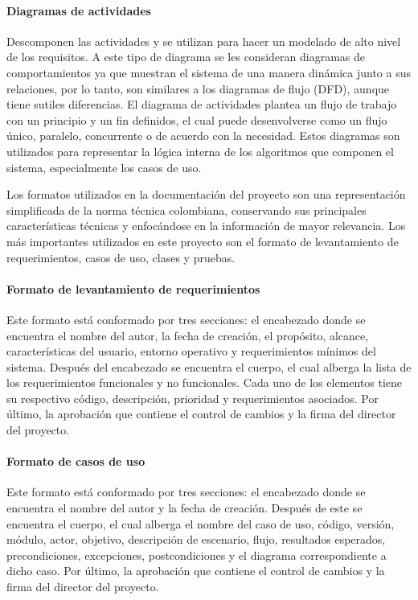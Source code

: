 \paragraph{Diagramas de actividades} Descomponen las actividades y se utilizan para hacer un modelado de alto nivel de los requisitos. A este tipo de diagrama se les consideran diagramas de comportamientos ya que muestran el sistema de una manera dinámica junto a sus relaciones, por lo tanto, son similares a los diagramas de flujo (DFD), aunque tiene sutiles diferencias. El diagrama de actividades plantea un flujo de trabajo con un principio y un fin definidos, el cual puede desenvolverse como un flujo único, paralelo, concurrente o de acuerdo con la necesidad. Estos diagramas son utilizados para representar la lógica interna de los algoritmos que componen el sistema, especialmente los casos de uso.

Los formatos utilizados en la documentación del proyecto son una representación simplificada de la norma técnica colombiana, conservando sus principales características técnicas y enfocándose en la información de mayor relevancia. Los más importantes utilizados en este proyecto son el formato de levantamiento de requerimientos, casos de uso, clases y pruebas.

\paragraph{Formato de levantamiento de requerimientos} Este formato está conformado por tres secciones: el encabezado donde se encuentra el nombre del autor, la fecha de creación, el propósito, alcance, características del usuario, entorno operativo y requerimientos mínimos del sistema. Después del encabezado se encuentra el cuerpo, el cual alberga la lista de los requerimientos funcionales y no funcionales. Cada uno de los elementos tiene su respectivo código, descripción, prioridad y requerimientos asociados. Por último, la aprobación que contiene el control de cambios y la firma del director del proyecto.

\paragraph{Formato de casos de uso} Este formato está conformado por tres secciones: el encabezado donde se encuentra el nombre del autor y la fecha de creación. Después de este se encuentra el cuerpo, el cual alberga el nombre del caso de uso, código, versión, módulo, actor, objetivo, descripción de escenario, flujo, resultados esperados, precondiciones, excepciones, postcondiciones y el diagrama correspondiente a dicho caso. Por último, la aprobación que contiene el control de cambios y la firma del director del proyecto.

